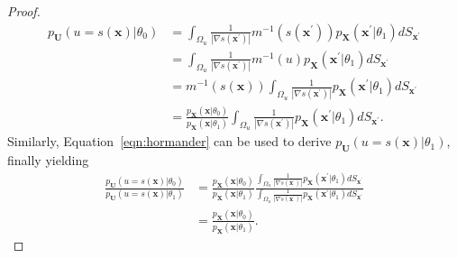 \documentclass[12pt]{article}
\numberwithin{equation}{section}
\theoremstyle{plain}
\begin{document}
\begin{proof}
\begin{align}
p_{\mathbf{U}}(u=s(\mathbf{x})|\theta_0) &= \int_{\Omega_u}  \frac{1}{|\nabla s(\mathbf{x}^\prime)|} m^{-1}(s(\mathbf{x}^\prime)) p_\mathbf{X}(\mathbf{x}^\prime|\theta_1) dS_{\mathbf{x}^\prime} \nonumber \\
&= \int_{\Omega_u}  \frac{1}{|\nabla s(\mathbf{x}^\prime)|} m^{-1}(u) p_\mathbf{X}(\mathbf{x}^\prime|\theta_1) dS_{\mathbf{x}^\prime} \nonumber \\
&= m^{-1}(s(\mathbf{x})) \int_{\Omega_u}  \frac{1}{|\nabla s(\mathbf{x}^\prime)|}  p_\mathbf{X}(\mathbf{x}^\prime|\theta_1) dS_{\mathbf{x}^\prime} \nonumber \\
&= \frac{p_\mathbf{X}(\mathbf{x}|\theta_0)}{p_\mathbf{X}(\mathbf{x}|\theta_1)} \int_{\Omega_u}  \frac{1}{|\nabla s(\mathbf{x}^\prime)|}  p_\mathbf{X}(\mathbf{x}^\prime|\theta_1) dS_{\mathbf{x}^\prime}. \label{eqn:factorization}
\end{align}
Similarly, Equation~\ref{eqn:hormander} can be used to derive $p_{\mathbf{U}}(u=s(\mathbf{x})|\theta_1)$, finally yielding
\begin{align}
\frac{p_{\mathbf{U}}(u=s(\mathbf{x})|\theta_0)}{p_{\mathbf{U}}(u=s(\mathbf{x})|\theta_1)} &= \frac{p_\mathbf{X}(\mathbf{x}|\theta_0)}{p_\mathbf{X}(\mathbf{x}|\theta_1)} \frac{\int_{\Omega_u}  \frac{1}{|\nabla s(\mathbf{x}^\prime)|}  p_\mathbf{X}(\mathbf{x}^\prime|\theta_1) dS_{\mathbf{x}^\prime}}{ \int_{\Omega_u}  \frac{1}{|\nabla s(\mathbf{x}^\prime)|}  p_\mathbf{X}(\mathbf{x}^\prime|\theta_1) dS_{\mathbf{x}^\prime} } \nonumber \\
&= \frac{p_\mathbf{X}(\mathbf{x}|\theta_0)}{p_\mathbf{X}(\mathbf{x}|\theta_1)}. \label{eqn:jacob}
\end{align}
\end{proof}


\end{document}
